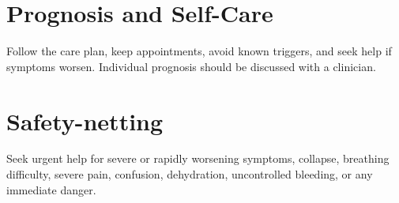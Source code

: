 \section*{Prognosis and Self-Care}
Follow the care plan, keep appointments, avoid known triggers, and seek help if symptoms worsen. Individual prognosis should be discussed with a clinician.
\section*{Safety-netting}
Seek urgent help for severe or rapidly worsening symptoms, collapse, breathing difficulty, severe pain, confusion, dehydration, uncontrolled bleeding, or any immediate danger.

